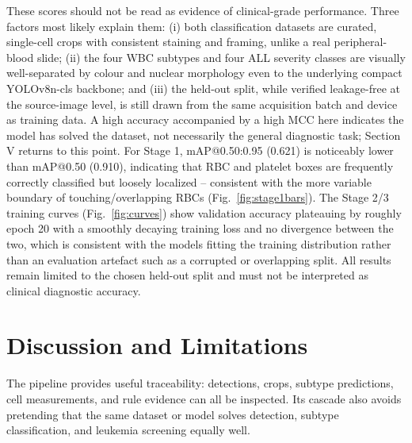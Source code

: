 \documentclass[conference]{IEEEtran}
\begin{document}
These scores should not be read as evidence of clinical-grade performance. Three factors most likely explain them: (i) both classification datasets are curated, single-cell crops with consistent staining and framing, unlike a real peripheral-blood slide; (ii) the four WBC subtypes and four ALL severity classes are visually well-separated by colour and nuclear morphology even to the underlying compact YOLOv8n-cls backbone; and (iii) the held-out split, while verified leakage-free at the source-image level, is still drawn from the same acquisition batch and device as training data. A high accuracy accompanied by a high MCC here indicates the model has solved the dataset, not necessarily the general diagnostic task; Section V returns to this point. For Stage 1, mAP@0.50:0.95 (0.621) is noticeably lower than mAP@0.50 (0.910), indicating that RBC and platelet boxes are frequently correctly classified but loosely localized -- consistent with the more variable boundary of touching/overlapping RBCs (Fig.~\ref{fig:stage1bars}). The Stage 2/3 training curves (Fig.~\ref{fig:curves}) show validation accuracy plateauing by roughly epoch 20 with a smoothly decaying training loss and no divergence between the two, which is consistent with the models fitting the training distribution rather than an evaluation artefact such as a corrupted or overlapping split. All results remain limited to the chosen held-out split and must not be interpreted as clinical diagnostic accuracy.

\section{Discussion and Limitations}

The pipeline provides useful traceability: detections, crops, subtype predictions, cell measurements, and rule evidence can all be inspected. Its cascade also avoids pretending that the same dataset or model solves detection, subtype classification, and leukemia screening equally well.
\end{document}
